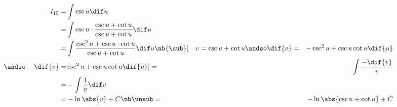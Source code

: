 \begin{samepage}
\begin{align*}
I_{15}
=&  \int  \csc{u} \dif u \\
=&  \int  \csc{u}
    \cdot \frac{ \csc{u} + \cot{u} }
              { \csc{u} + \cot{u} } \dif u \\
=&  \int  \frac{ \csc^2{u} + \csc{u} \cdot \cot{u}}
              {\csc{u} + \cot{u}} \dif u
\nb{\sub}[\quad
             v =  \csc{u} + \cot{u}
\andso  \dif{v}=& -\csc^2{u} + \csc{u}\cot{u}\dif{u} \\
\andso -\dif{v}=& \csc^2{u} + \csc{u}\cot{u}\dif{u}
]
=&  \int \frac{-\dif{v}}{v} \\
=&  -\int \frac{1}{v} \dif v \\
=&  -\ln \abs{v} + C
\nb\unsub
=&  -\ln \abs{\csc{u} + \cot{u}} + C
\end{align*}


\end{samepage}
